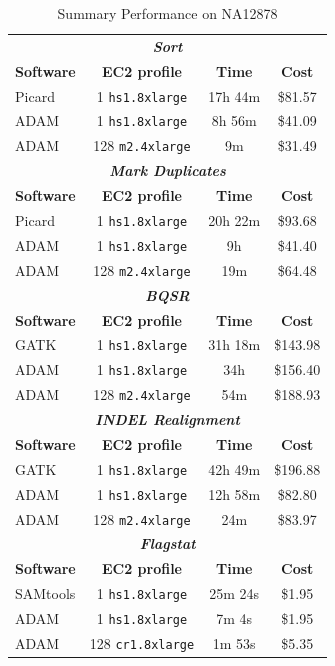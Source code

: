 \documentclass[masters]{ucbthesis}
\begin{document}
\begin{table}[h]
\caption{Summary Performance on NA12878}
\label{tab:overview}
\begin{center}
\begin{tabular}{ l c c c }
\hline
\multicolumn{4}{c}{\textbf{\textit{Sort}}} \\
\textbf{Software} & \textbf{EC2 profile} & \textbf{Time} & \textbf{Cost} \\
\hline
Picard & 1 \texttt{hs1.8xlarge} & 17h 44m & \$81.57 \\
ADAM & 1 \texttt{hs1.8xlarge} & 8h 56m & \$41.09 \\
ADAM & 128 \texttt{m2.4xlarge} & 9m & \$31.49 \\
\hline
\multicolumn{4}{c}{\textbf{\textit{Mark Duplicates}}} \\
\textbf{Software} & \textbf{EC2 profile} & \textbf{Time} & \textbf{Cost} \\
\hline
Picard & 1 \texttt{hs1.8xlarge} & 20h 22m & \$93.68 \\
ADAM & 1 \texttt{hs1.8xlarge} & 9h & \$41.40 \\
ADAM & 128 \texttt{m2.4xlarge} & 19m & \$64.48 \\ 
\hline
\multicolumn{4}{c}{\textbf{\textit{BQSR}}} \\
\textbf{Software} & \textbf{EC2 profile} & \textbf{Time} & \textbf{Cost} \\
\hline
GATK & 1 \texttt{hs1.8xlarge} & 31h 18m & \$143.98 \\
ADAM & 1 \texttt{hs1.8xlarge} & 34h & \$156.40 \\
ADAM & 128 \texttt{m2.4xlarge} & 54m & \$188.93 \\
\hline
\multicolumn{4}{c}{\textbf{\textit{INDEL Realignment}}} \\
\textbf{Software} & \textbf{EC2 profile} & \textbf{Time} & \textbf{Cost} \\
\hline
GATK & 1 \texttt{hs1.8xlarge} & 42h 49m & \$196.88 \\
ADAM & 1 \texttt{hs1.8xlarge} & 12h 58m & \$82.80 \\
ADAM & 128 \texttt{m2.4xlarge} & 24m & \$83.97 \\
\hline
\multicolumn{4}{c}{\textbf{\textit{Flagstat}}} \\
\textbf{Software} & \textbf{EC2 profile} & \textbf{Time} & \textbf{Cost} \\
\hline
SAMtools & 1 \texttt{hs1.8xlarge} & 25m 24s & \$1.95 \\
ADAM & 1 \texttt{hs1.8xlarge} & 7m 4s & \$1.95 \\
ADAM & 128 \texttt{cr1.8xlarge} & 1m 53s & \$5.35 \\
\hline
\end{tabular}
\end{center}
\end{table}
\end{document}
